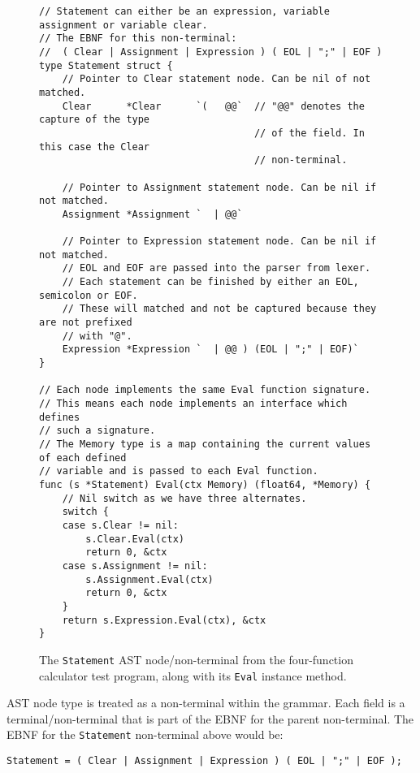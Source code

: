 \begin{figure}[H]
    \begin{verbatim}
// Statement can either be an expression, variable assignment or variable clear.
// The EBNF for this non-terminal:
//  ( Clear | Assignment | Expression ) ( EOL | ";" | EOF )
type Statement struct {
    // Pointer to Clear statement node. Can be nil of not matched.
    Clear      *Clear      `(   @@`  // "@@" denotes the capture of the type 
                                     // of the field. In this case the Clear
                                     // non-terminal.

    // Pointer to Assignment statement node. Can be nil if not matched.
    Assignment *Assignment `  | @@`

    // Pointer to Expression statement node. Can be nil if not matched.
    // EOL and EOF are passed into the parser from lexer.
    // Each statement can be finished by either an EOL, semicolon or EOF.
    // These will matched and not be captured because they are not prefixed
    // with "@".
    Expression *Expression `  | @@ ) (EOL | ";" | EOF)`
}

// Each node implements the same Eval function signature.
// This means each node implements an interface which defines
// such a signature.
// The Memory type is a map containing the current values of each defined
// variable and is passed to each Eval function.
func (s *Statement) Eval(ctx Memory) (float64, *Memory) {
    // Nil switch as we have three alternates.
    switch {
    case s.Clear != nil:
        s.Clear.Eval(ctx)
        return 0, &ctx
    case s.Assignment != nil:
        s.Assignment.Eval(ctx)
        return 0, &ctx
    }
    return s.Expression.Eval(ctx), &ctx
}
    \end{verbatim}
    \label{fig:four-func-calc-statement-ast-node}
    \cprotect\caption{The \verb|Statement| AST node/non-terminal from the four-function calculator test program, along with its \verb|Eval| instance method.}
\end{figure}

AST node type is treated as a non-terminal within the grammar. Each field is a terminal/non-terminal that is part of the EBNF for the parent non-terminal. The EBNF for the \verb|Statement| non-terminal above would be:

\begin{verbatim}
Statement = ( Clear | Assignment | Expression ) ( EOL | ";" | EOF );
\end{verbatim}

